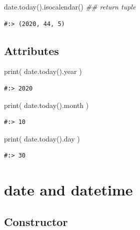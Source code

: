 \documentclass[
]{book}
\newenvironment{Shaded}{\begin{snugshade}}{\end{snugshade}}
\newcommand{\BuiltInTok}[1]{#1}
\newcommand{\CommentTok}[1]{\textcolor[rgb]{0.37,0.37,0.37}{\textit{#1}}}
\newcommand{\NormalTok}[1]{#1}
\begin{document}
\begin{Shaded}
\begin{Highlighting}[]
\NormalTok{date.today().isocalendar() }\CommentTok{## return tuple }
\end{Highlighting}
\end{Shaded}

\begin{verbatim}
#:> (2020, 44, 5)
\end{verbatim}

\hypertarget{attributes}{%
\subsection{Attributes}\label{attributes}}

\begin{Shaded}
\begin{Highlighting}[]
\BuiltInTok{print}\NormalTok{( date.today().year )}
\end{Highlighting}
\end{Shaded}

\begin{verbatim}
#:> 2020
\end{verbatim}

\begin{Shaded}
\begin{Highlighting}[]
\BuiltInTok{print}\NormalTok{( date.today().month )}
\end{Highlighting}
\end{Shaded}

\begin{verbatim}
#:> 10
\end{verbatim}

\begin{Shaded}
\begin{Highlighting}[]
\BuiltInTok{print}\NormalTok{( date.today().day )}
\end{Highlighting}
\end{Shaded}

\begin{verbatim}
#:> 30
\end{verbatim}

\hypertarget{date-and-datetime}{%
\section{date and datetime}\label{date-and-datetime}}

\hypertarget{constructor-4}{%
\subsection{Constructor}\label{constructor-4}}
\end{document}
